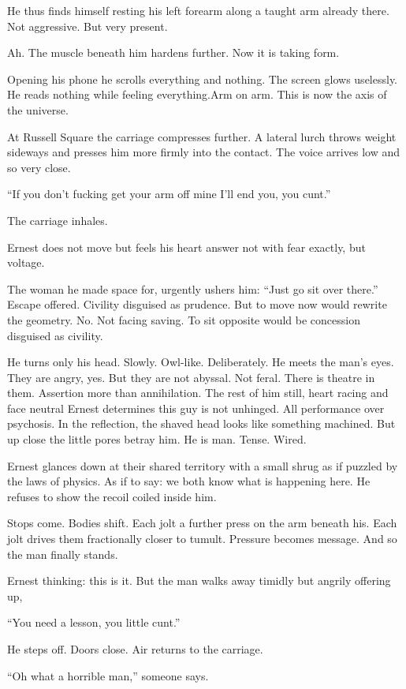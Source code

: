 He thus finds himself resting his left forearm along a taught arm already there. Not aggressive. But very present.

Ah. The muscle beneath him hardens further. Now it is taking form.

Opening his phone he scrolls everything and nothing. The screen glows uselessly. He reads nothing while feeling everything.Arm on arm. This is now the axis of the universe.

At Russell Square the carriage compresses further. A lateral lurch throws weight sideways and presses him more firmly into the contact. The voice arrives low and so very close.

“If you don’t fucking get your arm off mine I’ll end you, you cunt.”

The carriage inhales.

Ernest does not move but feels his heart answer not with fear exactly, but voltage.

The woman he made space for, urgently ushers him: “Just go sit over there.” Escape offered. Civility disguised as prudence. But to move now would rewrite the geometry. No. Not facing saving. To sit opposite would be concession disguised as civility.

He turns only his head. Slowly. Owl-like. Deliberately. He meets the man’s eyes.
They are angry, yes. But they are not abyssal. Not feral. There is theatre in them. Assertion more than annihilation. The rest of him still, heart racing and face neutral Ernest determines this guy is not unhinged. All performance over psychosis. In the reflection, the shaved head looks like something machined. But up close the little pores betray him. He is man. Tense. Wired.

Ernest glances down at their shared territory with a small shrug as if puzzled by the laws of physics. As if to say: we both know what is happening here. He refuses to show the recoil coiled inside him.

Stops come. Bodies shift. Each jolt a further press on the arm beneath his. Each jolt drives them fractionally closer to tumult. Pressure becomes message. And so the man finally stands.

Ernest thinking: this is it. But the man walks away timidly but angrily offering up,

“You need a lesson, you little cunt.”

He steps off. Doors close. Air returns to the carriage.

“Oh what a horrible man,” someone says.

